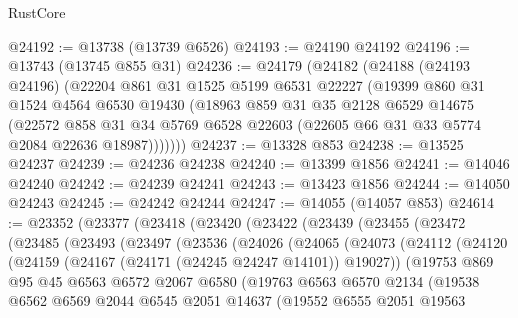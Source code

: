 \begin{lexlean}{RustCore}
\begin{coremodule}
@24192 := @13738 (@13739 @6526)
@24193 := @24190 @24192
@24196 := @13743 (@13745 @855 @31)
@24236 := @24179
    (@24182
      (@24188
        (@24193 @24196)
        (@22204
          @861
          @31
          @1525
          @5199
          @6531
          @22227
          (@19399
            @860
            @31
            @1524
            @4564
            @6530
            @19430
            (@18963
              @859
              @31
              @35
              @2128
              @6529
              @14675
              (@22572
                @858
                @31
                @34
                @5769
                @6528
                @22603
                (@22605 @66 @31 @33 @5774 @2084 @22636 @18987)))))))
@24237 := @13328 @853
@24238 := @13525 @24237
@24239 := @24236 @24238
@24240 := @13399 @1856
@24241 := @14046 @24240
@24242 := @24239 @24241
@24243 := @13423 @1856
@24244 := @14050 @24243
@24245 := @24242 @24244
@24247 := @14055 (@14057 @853)
@24614 := @23352
    (@23377
      (@23418
        (@23420
          (@23422
            (@23439
              (@23455
                (@23472
                  (@23485
                    (@23493
                      (@23497
                        (@23536
                          (@24026
                            (@24065
                              (@24073
                                (@24112
                                  (@24120
                                    (@24159 (@24167 (@24171 (@24245 @24247 @14101)) @19027))
                                    (@19753
                                      @869
                                      @95
                                      @45
                                      @6563
                                      @6572
                                      @2067
                                      @6580
                                      (@19763
                                        @6563
                                        @6570
                                        @2134
                                        (@19538
                                          @6562
                                          @6569
                                          @2044
                                          @6545
                                          @2051
                                          @14637
                                          (@19552
                                            @6555
                                            @2051
                                            @19563

\end{coremodule}
\end{lexlean}
